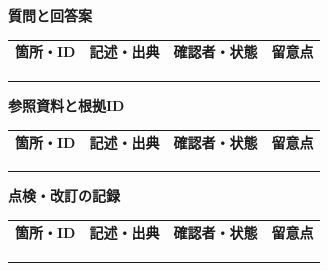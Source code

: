 \documentclass[11pt,a4paper]{article}
\begin{document}
\par{}\noindent\textbf{質問と回答案}\par\vspace{1mm}
{\fontsize{8.5}{13}\selectfont
\begin{tabularx}{\linewidth}{@{}XXXX@{}}
\textbf{箇所・ID} & \textbf{記述・出典} & \textbf{確認者・状態} & \textbf{留意点}\\[2mm]
\strut & \strut & \strut & \strut\\[5mm]
\strut & \strut & \strut & \strut\\[5mm]
\strut & \strut & \strut & \strut\\[5mm]
\end{tabularx}
}\vspace{2mm}\par
{}
\par{}\noindent\textbf{参照資料と根拠ID}\par\vspace{1mm}
{\fontsize{8.5}{13}\selectfont
\begin{tabularx}{\linewidth}{@{}XXXX@{}}
\textbf{箇所・ID} & \textbf{記述・出典} & \textbf{確認者・状態} & \textbf{留意点}\\[2mm]
\strut & \strut & \strut & \strut\\[5mm]
\strut & \strut & \strut & \strut\\[5mm]
\strut & \strut & \strut & \strut\\[5mm]
\end{tabularx}
}\vspace{2mm}\par
{}
\par{}\noindent\textbf{点検・改訂の記録}\par\vspace{1mm}
{\fontsize{8.5}{13}\selectfont
\begin{tabularx}{\linewidth}{@{}XXXX@{}}
\textbf{箇所・ID} & \textbf{記述・出典} & \textbf{確認者・状態} & \textbf{留意点}\\[2mm]
\strut & \strut & \strut & \strut\\[5mm]
\strut & \strut & \strut & \strut\\[5mm]
\strut & \strut & \strut & \strut\\[5mm]
\end{tabularx}
}\vspace{2mm}\par
\end{document}
